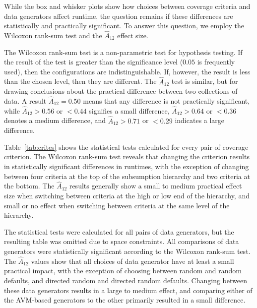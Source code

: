 
While the box and whisker plots show how choices between coverage criteria and data generators affect runtime, the
question remains if these differences are statistically and practically significant. To answer this question, we employ
the Wilcoxon rank-sum test and the $\hat{A}_{12}$ effect size.

The Wilcoxon rank-sum test is a non-parametric test for hypothesis testing.  If the result of the test is greater than
the significance level ($0.05$ is frequently used), then the configurations are indistinguishable.  If, however, the
result is less than the chosen level, then they are different.  The $\hat{A}_{12}$ test is similar, but for drawing
conclusions about the practical difference between two collections of data.  A result $\hat{A}_{12}=0.50$ means that any
difference is not practically significant, while $\hat{A}_{12}>0.56$ or $<0.44$ signifies a small difference,
$\hat{A}_{12}>0.64$ or $<0.36$ denotes a medium difference, and $\hat{A}_{12}>0.71$ or $<0.29$ indicates a large
difference.

Table~\ref{tab:crites} shows the statistical tests calculated for every pair of coverage criterion. The Wilcoxon
rank-sum test reveals that changing the criterion results in statistically significant differences in runtimes, with the
exception of changing between four criteria at the top of the subsumption hierarchy and two criteria at the
bottom.  The $\hat{A}_{12}$ results generally show a small to medium practical effect size when switching between criteria at
the high or low end of the hierarchy, and small or no effect when switching between criteria at the same level of the
hierarchy.

The statistical tests were calculated for all pairs of data generators, but the resulting table was omitted due to space
constraints. All comparisons of data generators were statistically significant according to the Wilcoxon rank-sum test.
The $\hat{A}_{12}$ values show that all choices of data generator have at least a small practical impact, with the
exception of choosing between random and random defaults, and directed random and directed random defaults.  Changing
between these data generators results in a large to medium effect, and comparing either of the AVM-based
generators to the other primarily resulted in a small difference.
